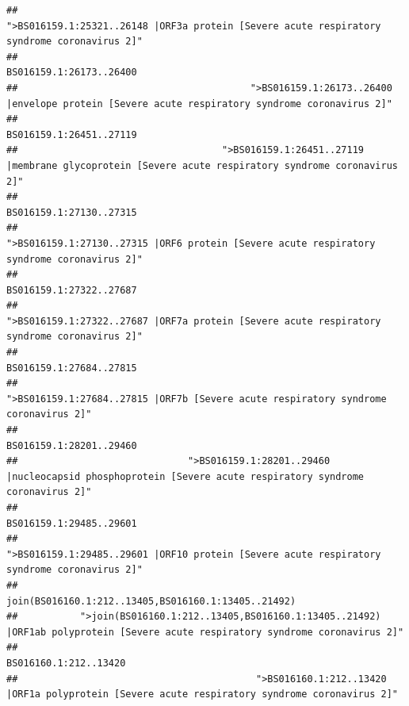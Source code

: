 \documentclass[
]{article}
\begin{document}
\begin{verbatim}
##                                            ">BS016159.1:25321..26148 |ORF3a protein [Severe acute respiratory syndrome coronavirus 2]" 
##                                                                                                                BS016159.1:26173..26400 
##                                         ">BS016159.1:26173..26400 |envelope protein [Severe acute respiratory syndrome coronavirus 2]" 
##                                                                                                                BS016159.1:26451..27119 
##                                    ">BS016159.1:26451..27119 |membrane glycoprotein [Severe acute respiratory syndrome coronavirus 2]" 
##                                                                                                                BS016159.1:27130..27315 
##                                             ">BS016159.1:27130..27315 |ORF6 protein [Severe acute respiratory syndrome coronavirus 2]" 
##                                                                                                                BS016159.1:27322..27687 
##                                            ">BS016159.1:27322..27687 |ORF7a protein [Severe acute respiratory syndrome coronavirus 2]" 
##                                                                                                                BS016159.1:27684..27815 
##                                                    ">BS016159.1:27684..27815 |ORF7b [Severe acute respiratory syndrome coronavirus 2]" 
##                                                                                                                BS016159.1:28201..29460 
##                              ">BS016159.1:28201..29460 |nucleocapsid phosphoprotein [Severe acute respiratory syndrome coronavirus 2]" 
##                                                                                                                BS016159.1:29485..29601 
##                                            ">BS016159.1:29485..29601 |ORF10 protein [Severe acute respiratory syndrome coronavirus 2]" 
##                                                                                    join(BS016160.1:212..13405,BS016160.1:13405..21492) 
##           ">join(BS016160.1:212..13405,BS016160.1:13405..21492) |ORF1ab polyprotein [Severe acute respiratory syndrome coronavirus 2]" 
##                                                                                                                  BS016160.1:212..13420 
##                                          ">BS016160.1:212..13420 |ORF1a polyprotein [Severe acute respiratory syndrome coronavirus 2]" 

\end{verbatim}
\end{document}
